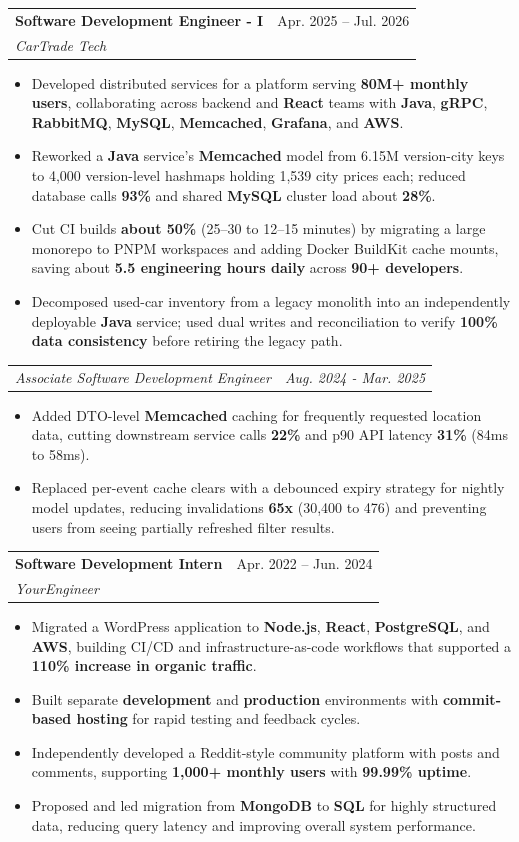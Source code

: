 \documentclass[letterpaper,11pt]{article}
\makeatletter
\newcommand{\resumeItem}[1]{
  \item\small{
    {#1 \vspace{-2pt}}
  }
}
\newcommand{\resumeSubheading}[4]{
  \vspace{-2pt}\item
    \begin{tabular*}{0.97\textwidth}[t]{l@{\extracolsep{\fill}}r}
      \textbf{#1} & #2 \\
      \textit{\small#3} & \textit{\small #4} \\
    \end{tabular*}\vspace{-7pt}
}
\newcommand{\resumeSubSubheading}[2]{
    \item
    \begin{tabular*}{0.97\textwidth}{l@{\extracolsep{\fill}}r}
      \textit{\small#1} & \textit{\small #2} \\
    \end{tabular*}\vspace{-7pt}
}
\newcommand{\resumeItemListStart}{\begin{itemize}}
\newcommand{\resumeItemListEnd}{\end{itemize}\vspace{-5pt}}
\makeatother
\begin{document}
\resumeSubheading
{Software Development Engineer - I}{Apr. 2025 -- Jul. 2026}
{CarTrade Tech}{ }
\resumeItemListStart
\resumeItem{Developed distributed services for a platform serving \textbf{80M+ monthly users}, collaborating across backend and \textbf{React} teams with \textbf{Java}, \textbf{gRPC}, \textbf{RabbitMQ}, \textbf{MySQL}, \textbf{Memcached}, \textbf{Grafana}, and \textbf{AWS}.}
\resumeItem{Reworked a \textbf{Java} service's \textbf{Memcached} model from 6.15M version-city keys to 4,000 version-level hashmaps holding 1,539 city prices each; reduced database calls \textbf{93\%} and shared \textbf{MySQL} cluster load about \textbf{28\%}.}
\resumeItem{Cut CI builds \textbf{about 50\%} (25--30 to 12--15 minutes) by migrating a large monorepo to PNPM workspaces and adding Docker BuildKit cache mounts, saving about \textbf{5.5 engineering hours daily} across \textbf{90+ developers}.}
\resumeItem{Decomposed used-car inventory from a legacy monolith into an independently deployable \textbf{Java} service; used dual writes and reconciliation to verify \textbf{100\% data consistency} before retiring the legacy path.}
\resumeItemListEnd
\resumeSubSubheading
{Associate Software Development Engineer}{Aug. 2024 - Mar. 2025}
\resumeItemListStart
\resumeItem{Added DTO-level \textbf{Memcached} caching for frequently requested location data, cutting downstream service calls \textbf{22\%} and p90 API latency \textbf{31\%} (84ms to 58ms).}
\resumeItem{Replaced per-event cache clears with a debounced expiry strategy for nightly model updates, reducing invalidations \textbf{65x} (30,400 to 476) and preventing users from seeing partially refreshed filter results.}
\resumeItemListEnd

\resumeSubheading
{Software Development Intern}{Apr. 2022 -- Jun. 2024}
{YourEngineer}{ }
\resumeItemListStart
\resumeItem{Migrated a WordPress application to \textbf{Node.js}, \textbf{React}, \textbf{PostgreSQL}, and \textbf{AWS}, building CI/CD and infrastructure-as-code workflows that supported a \textbf{110\% increase in organic traffic}.}
\resumeItem{Built separate \textbf{development} and \textbf{production} environments with \textbf{commit-based hosting} for rapid testing and feedback cycles.}
\resumeItem{Independently developed a Reddit-style community platform with posts and comments, supporting \textbf{1,000+ monthly users} with \textbf{99.99\% uptime}.}
\resumeItem{Proposed and led migration from \textbf{MongoDB} to \textbf{SQL} for highly structured data, reducing query latency and improving overall system performance.}
\resumeItemListEnd
\end{document}
